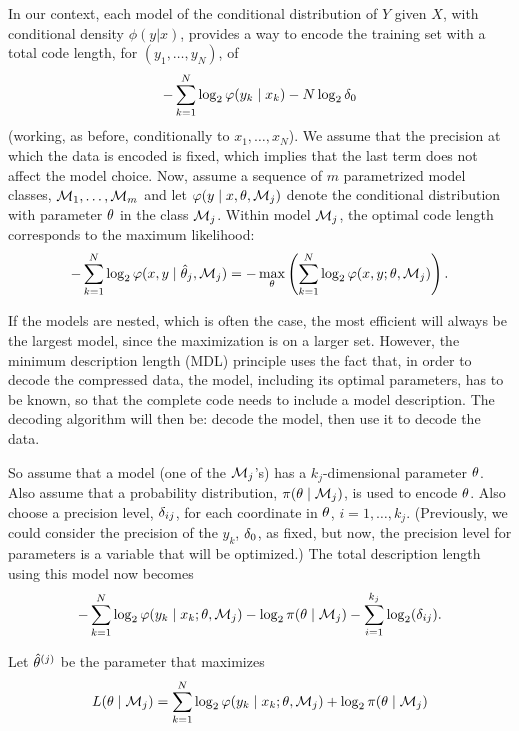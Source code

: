In our context, each model of the conditional distribution of $Y$ given $X$, with conditional density 
 $\phi(y|x)$, provides a way to encode the training
set with a total code length, for $(y_1, \ldots, y_N)$, of
$$
- \sum_{k=1}^N \log_2 \varphi(y_k\mid x_k) - N\log_2\delta_0
$$
(working, as before, conditionally to $x_1, \ldots, x_N$).
We assume that the precision at which the data is encoded is fixed,
which implies 
that the last term does not affect the model choice. Now, assume a sequence of $m$  parametrized model classes, ${\mathcal M}_1, \ldots, {\mathcal M}_m$ and let $\varphi(y\mid x,\theta, {\mathcal M}_j)$ denote the conditional distribution with parameter $\theta$ in the class ${\mathcal M}_j$. 
Within model ${\mathcal M}_j$, the optimal code length corresponds to the
maximum likelihood:
$$
- \sum_{k=1}^N \log_2 \varphi(x, y\mid \hat {\theta}_j, {\mathcal M}_j) = - \max_{\theta}\left(\sum_{k=1}^N \log_2 \varphi(x, y; \theta, {\mathcal M}_j)\right).
$$

If the models are nested, which is often the case,  the most efficient  will always be the
largest model, since the maximization is on a larger set. However,  the minimum description length (MDL) principle uses the fact that, in
order to decode the compressed data, the model, including its optimal
parameters, has to be known, so that the complete code  needs to
include a model description. The decoding algorithm will then
be: decode the model, then use it to decode the data. 

So assume that a model (one of the ${\mathcal M}_j$'s) has a $k_j$-dimensional
parameter $\theta$. Also assume that a probability distribution, $\pi(\theta\mid {\mathcal M}_j)$, is used to
encode $\theta$. Also choose a precision level, $\delta_{ij}$, for each coordinate in
$\theta$, $i=1, \ldots, k_j$. (Previously, we could consider the precision of
the $y_k$, $\delta_0$, as fixed, but now, the precision level for parameters is a variable that will be optimized.) The total description length using this model now becomes
$$
- \sum_{k=1}^N \log_2 \varphi(y_k\mid x_k; \theta, {\mathcal M}_j) - \log_2\pi(\theta\mid {\mathcal M}_j) -
\sum_{i=1}^{k_j} \log_2(\delta_{ij}).
$$

Let ${\hat{\theta}}^{(j)}$ be the parameter that maximizes
$$
L(\theta\mid {\mathcal M}_j)  = \sum_{k=1}^N \log_2 \varphi(y_k\mid x_k; \theta, {\mathcal M}_j) + \log_2\pi(\theta\mid {\mathcal M}_j)$$ 

